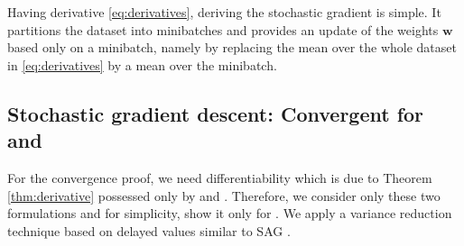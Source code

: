 Having derivative \eqref{eq:derivatives}, deriving the stochastic gradient is simple. It partitions the dataset into minibatches and provides an update of the weights $\bm{w}$ based only on a minibatch, namely by replacing the mean over the whole dataset in \eqref{eq:derivatives} by a mean over the minibatch.

\subsection{Stochastic gradient descent: Convergent for \PatMat and \PatMatNP}

For the convergence proof, we need differentiability which is due to Theorem \ref{thm:derivative} possessed only by \PatMat and \PatMatNP. Therefore, we consider only these two formulations and for simplicity, show it only for \PatMat. We apply a variance reduction technique based on delayed values similar to SAG \cite{schmidt2017minimizing}. 

